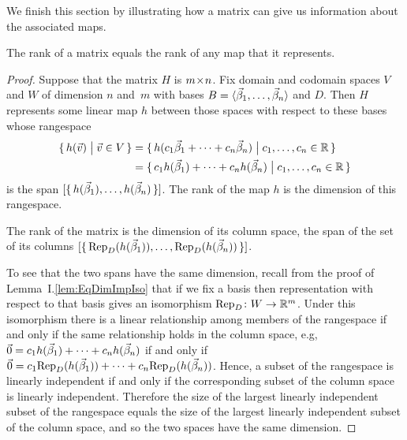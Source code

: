 We finish this section by illustrating how a matrix can 
give us information
about the associated maps.

\begin{theorem} \label{th:RankMatEqRankMap}
The rank of a matrix equals the rank of any map that it represents.
\end{theorem}

\begin{proof}
Suppose that the matrix \( H \) is \( \nbym{m}{n} \). 
Fix domain and codomain spaces $V$ and $W$ of dimension $n$ and~$m$ with
bases \( B=\sequence{\vec{\beta}_1,\dots,\vec{\beta}_n} \) and \( D \).
Then \( H \) represents some linear map $h$ between those spaces with respect 
to these bases whose rangespace
\begin{align*}
  \set{h(\vec{v})\suchthat \vec{v}\in V}
  &=\set{h(c_1\vec{\beta}_1+\dots+c_n\vec{\beta}_n)  
           \suchthat c_1,\dots,c_n\in\Re}                    \\
  &=\set{c_1h(\vec{\beta}_1)+\dots+c_nh(\vec{\beta}_n)
            \suchthat c_1,\dots,c_n\in\Re}
\end{align*}
is the span $\spanof{\set{h(\vec{\beta}_1),\dots,h(\vec{\beta}_n)}}$.
The rank of the map $h$ is the dimension of this rangespace.

The rank of the matrix is the dimension of its column space,
the span of the set of its columns
$\spanof{\set{\rep{h(\vec{\beta}_1)}{D},\dots,\rep{h(\vec{\beta}_n)}{D}}}$.

To see that the two spans have the same dimension, recall 
from the proof of Lemma~I.\ref{lem:EqDimImpIso} that if we fix a basis then
representation with respect to that basis gives an isomorphism 
$\map{\mbox{Rep}_D}{W}{\Re^m}$.
Under this isomorphism there is a linear relationship among members of the
rangespace if and only if the same relationship holds in the
column space, e.g,
$\zero=c_1h(\vec{\beta}_1)+\dots+c_nh(\vec{\beta}_n)$ if and only if
$\zero=c_1\rep{h(\vec{\beta}_1)}{D}+\dots+c_n\rep{h(\vec{\beta}_n)}{D}$.
Hence, a subset of the rangespace is linearly independent if and only if the
corresponding subset of the column space is linearly independent.
Therefore the size of the largest linearly independent subset of the
rangespace equals the size of the largest linearly independent subset of the
column space, and so the two spaces have the same dimension.
\end{proof}

